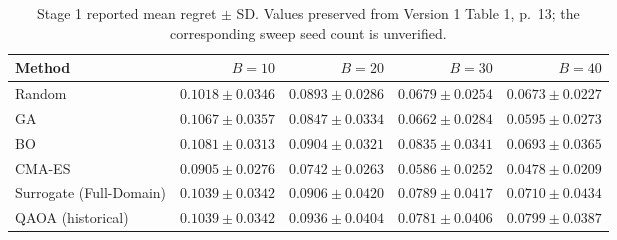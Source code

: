 \begin{table}[htbp]\centering
\caption{Stage 1 reported mean regret $\pm$ SD. Values preserved from Version 1 Table 1, p.~13; the corresponding sweep seed count is unverified.}\label{tab:s1}
\scriptsize
\setlength{\tabcolsep}{4pt}
\begin{tabular}{lrrrr}\toprule
Method & $B=10$ & $B=20$ & $B=30$ & $B=40$ \\ \midrule
Random & $0.1018\pm0.0346$ & $0.0893\pm0.0286$ & $0.0679\pm0.0254$ & $0.0673\pm0.0227$ \\
GA & $0.1067\pm0.0357$ & $0.0847\pm0.0334$ & $0.0662\pm0.0284$ & $0.0595\pm0.0273$ \\
BO & $0.1081\pm0.0313$ & $0.0904\pm0.0321$ & $0.0835\pm0.0341$ & $0.0693\pm0.0365$ \\
CMA-ES & $0.0905\pm0.0276$ & $0.0742\pm0.0263$ & $0.0586\pm0.0252$ & $0.0478\pm0.0209$ \\
Surrogate (Full-Domain) & $0.1039\pm0.0342$ & $0.0906\pm0.0420$ & $0.0789\pm0.0417$ & $0.0710\pm0.0434$ \\
QAOA (historical) & $0.1039\pm0.0342$ & $0.0936\pm0.0404$ & $0.0781\pm0.0406$ & $0.0799\pm0.0387$ \\
\bottomrule\end{tabular}
\end{table}

